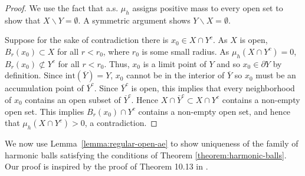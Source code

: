 \documentclass[12pt]{amsart}
\numberwithin{equation}{section}
\begin{document}
	\begin{proof}
		
		We use the fact that a.s. $\mu_h$ assigns positive mass to every open set to show that $X \backslash Y = \emptyset$. A symmetric argument shows $Y \backslash X = \emptyset$. 
		
		Suppose for the sake of contradiction there is $x_0 \in X \cap Y^c$. As $X$ is open, $B_r(x_0) \subset X$ for all $r < r_0$, where $r_0$ is some small radius. 
		As $\mu_h(X \cap Y^c) = 0$, $B_r(x_0) \not \subset Y^c$ for all $r < r_0$. Thus, 
		$x_0$ is a limit point of $Y$ and so $x_0 \in \partial Y$ by definition.  
		Since $\mathrm{int}(\overline{Y}) = Y$, $x_0$ cannot be in the interior of $\overline Y$ so $x_0$ must be an accumulation point of $\overline Y^c$.
		Since $\overline Y^c$ is open, this implies that every neighborhood of $x_0$ contains an open subset of $\overline Y^c$. Hence $X\cap \overline Y^c \subset X\cap Y^c$ contains a non-empty open set.
		This implies $B_r(x_0) \cap Y^c$ contains a non-empty open set, and hence that $\mu_h(X \cap Y^c) > 0$, a contradiction. 
	\end{proof}
	We now use Lemma~\ref{lemma:regular-open-ae} to show uniqueness of the family of harmonic balls satisfying the conditions of Theorem \ref{theorem:harmonic-balls}.
	Our proof is inspired by the proof of Theorem 10.13 in \cite{sakai2006quadrature}. 
	
	
	
\end{document}
